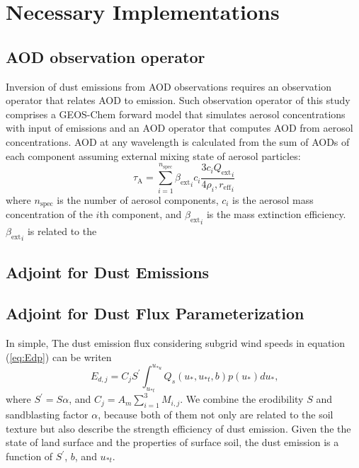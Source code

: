\section{Necessary Implementations}

 \subsection{AOD observation operator}

  Inversion of dust emissions from AOD observations requires 
  an observation operator that relates AOD to emission. 
  Such observation operator of this study comprises 
  a GEOS-Chem forward model that simulates aerosol concentrations 
  with input of emissions and an AOD operator that computes AOD 
  from aerosol concentrations. 
  AOD at any wavelength is calculated from the sum of AODs 
  of each component assuming external mixing state of aerosol
  particles:
  \begin{equation} \label{eq:aod} 
   \tau_\text{A} = \displaystyle \sum_{i=1}^{n_\text{spec}} 
                   {\beta_\text{ext}}_i c_i
                   \frac{3c_i {Q_\text{ext}}_i}{4 \rho_i, {r_\text{eff}}_i}
  \end{equation}
  where $n_\text{spec}$ is the number of aerosol components, 
  $c_i$ is the aerosol mass concentration of the $i$th component, 
  and ${\beta_\text{ext}}_i$ is the mass extinction efficiency. 
  ${\beta_\text{ext}}_i$ is related to the 

 
 \subsection{Adjoint for Dust Emissions}
 \subsection{Adjoint for Dust Flux Parameterization}

   In simple, The dust emission flux considering subgrid wind speeds in equation 
   (\ref{eq:Edp}) can be writen
   \begin{equation}
   E_{d,j} = C_j S^\prime \int^{u_{*u}}_{u_{*t}} Q_s(u_*,u_{*t},b) p(u_*) d u_* \mbox{,}
   \end{equation}
   where $S^\prime = S \alpha$, and $C_j=A_m \displaystyle \sum_{i=1}^3 M_{i,j}$. We combine
   the erodibility $S$ and sandblasting factor $\alpha$, because both of them not only are 
   related to the soil texture but also describe the strength efficiency of dust emission. 
   Given the the state of land surface and the properties of surface soil, the dust emission
   is a function of $S^\prime$, $b$, and $u_{*t}$. 


